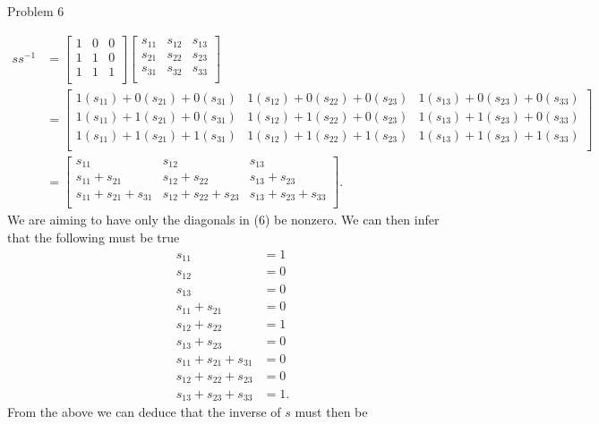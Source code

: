 \begin{problem}{Problem 6}
\begin{highlight}[Solution]
        \begin{align}
            ss^{-1} & = 
            \begin{bmatrix}
                1 & 0 & 0 \\
                1 & 1 & 0 \\
                1 & 1 & 1 \\
            \end{bmatrix}
            \begin{bmatrix}
                s_{11} & s_{12} & s_{13} \\
                s_{21} & s_{22} & s_{23} \\
                s_{31} & s_{32} & s_{33} \\
            \end{bmatrix} \\
            & = 
            \begin{bmatrix}
                1(s_{11}) + 0(s_{21}) + 0(s_{31}) & 1(s_{12}) + 0(s_{22}) + 0(s_{23}) & 1(s_{13}) + 0(s_{23}) + 0(s_{33}) \\
                1(s_{11}) + 1(s_{21}) + 0(s_{31}) & 1(s_{12}) + 1(s_{22}) + 0(s_{23}) & 1(s_{13}) + 1(s_{23}) + 0(s_{33}) \\
                1(s_{11}) + 1(s_{21}) + 1(s_{31}) & 1(s_{12}) + 1(s_{22}) + 1(s_{23}) & 1(s_{13}) + 1(s_{23}) + 1(s_{33}) \\
            \end{bmatrix} \\
            & = 
            \begin{bmatrix}
                s_{11} & s_{12} & s_{13} \\
                s_{11} + s_{21} & s_{12} + s_{22} & s_{13} + s_{23} \\
                s_{11} + s_{21} + s_{31} & s_{12} + s_{22} + s_{23} & s_{13} + s_{23} + s_{33} \\
            \end{bmatrix}.
        \end{align}
        We are aiming to have only the diagonals in (6) be nonzero. We can then infer that the following must be true
        \begin{align*}
            s_{11} & = 1 \\
            s_{12} & = 0 \\
            s_{13} & = 0 \\
            s_{11} + s_{21} & = 0 \\
            s_{12} + s_{22} & = 1 \\
            s_{13} + s_{23} & = 0 \\
            s_{11} + s_{21} + s_{31} & = 0 \\
            s_{12} + s_{22} + s_{23} & = 0 \\
            s_{13} + s_{23} + s_{33} & = 1.
        \end{align*}
        From the above we can deduce that the inverse of $s$ must then be


\end{highlight}
\end{problem}
